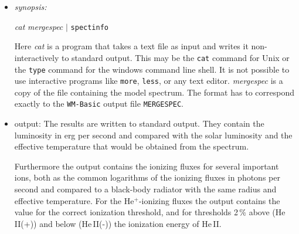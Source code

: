 \documentclass[a4paper,10pt]{article}
\begin{document}
\begin{itemize}
\item \textit{synopsis:}
 \begin{center} 
 \textit{cat} \textit{mergespec} $|$ \texttt{spectinfo}
 \end{center}

 Here \textit{cat} is a program that takes a text file as input and writes it 
 non-interactively to 
 standard output. This may be the \texttt{cat} command for Unix or the 
 \texttt{type} command for the windows command line shell. It is not possible 
 to use interactive programs like \texttt{more}, \texttt{less}, or any text 
 editor. \textit{mergespec} is a copy of the file containing the model 
 spectrum. The format has to correspond exactly to the \texttt{WM-Basic} output 
 file \texttt{MERGESPEC}.

\item{output:} The results are written to standard output. They contain the 
 luminosity in erg per second and compared with the solar luminosity
 and the effective temperature that would be obtained from the spectrum.
 
 Furthermore the output contains the ionizing fluxes for several important ions, 
 both as the common logarithms of the ionizing fluxes in photons per second and 
 compared to a black-body radiator with the same radius and effective 
 temperature. For the $\mathrm{He^+}$-ionizing fluxes the output 
 contains the value for the correct ionization threshold, and for  thresholds 
 2\,\%  above ({He}\,{II}(+)) and below ({He}\,{II}(-)) the ionization  energy 
 of {He}\,{II}. 
\end{itemize}

\cleardoublepage
\end{document}
